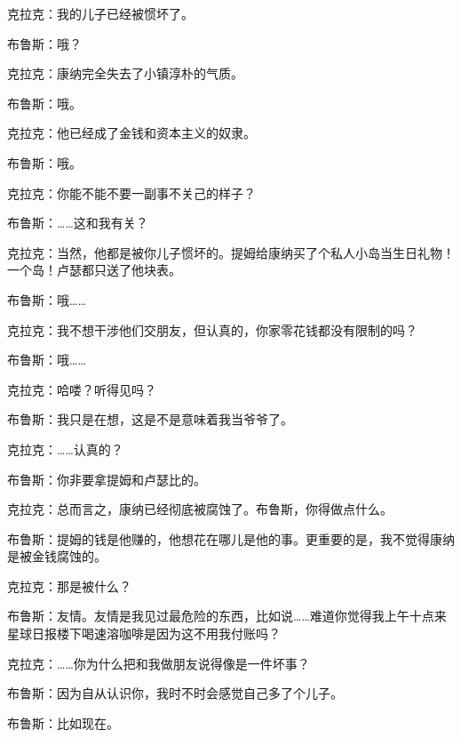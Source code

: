 克拉克：我的儿子已经被惯坏了。

布鲁斯：哦？

克拉克：康纳完全失去了小镇淳朴的气质。

布鲁斯：哦。

克拉克：他已经成了金钱和资本主义的奴隶。

布鲁斯：哦。

克拉克：你能不能不要一副事不关己的样子？

布鲁斯：……这和我有关？

克拉克：当然，他都是被你儿子惯坏的。提姆给康纳买了个私人小岛当生日礼物！一个岛！卢瑟都只送了他块表。

布鲁斯：哦……

克拉克：我不想干涉他们交朋友，但认真的，你家零花钱都没有限制的吗？

布鲁斯：哦……

克拉克：哈喽？听得见吗？

布鲁斯：我只是在想，这是不是意味着我当爷爷了。

克拉克：……认真的？

布鲁斯：你非要拿提姆和卢瑟比的。

克拉克：总而言之，康纳已经彻底被腐蚀了。布鲁斯，你得做点什么。

布鲁斯：提姆的钱是他赚的，他想花在哪儿是他的事。更重要的是，我不觉得康纳是被金钱腐蚀的。

克拉克：那是被什么？

布鲁斯：友情。友情是我见过最危险的东西，比如说……难道你觉得我上午十点来星球日报楼下喝速溶咖啡是因为这不用我付账吗？

克拉克：……你为什么把和我做朋友说得像是一件坏事？

布鲁斯：因为自从认识你，我时不时会感觉自己多了个儿子。

布鲁斯：比如现在。
